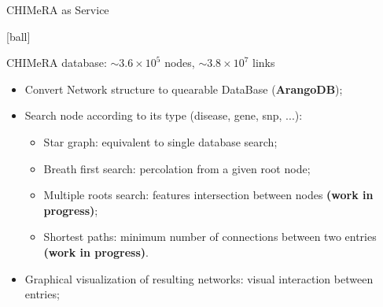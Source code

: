 \documentclass{standalone}
\begin{document}
\begin{frame}{CHIMeRA as Service}

  [ball]

  \centering CHIMeRA database: $\sim 3.6\times10^5$ nodes, $\sim 3.8\times10^7$ links

  \begin{block}

    \begin{itemize}
      \setlength\itemsep{2em}

      \item Convert Network structure to quearable DataBase (\textbf{ArangoDB});

      \item Search node according to its type (disease, gene, snp, ...):
        \begin{itemize}
          \setlength\itemsep{1em}
          \item Star graph: equivalent to single database search;
          \item Breath first search: percolation from a given root node;
          \item Multiple roots search: features intersection between nodes \textbf{(work in progress)};
          \item Shortest paths: minimum number of connections between two entries \textbf{(work in progress)}.
        \end{itemize}

      \item Graphical visualization of resulting networks: visual interaction between entries;

    \end{itemize}

  \end{block}

\end{frame}
\end{document}
